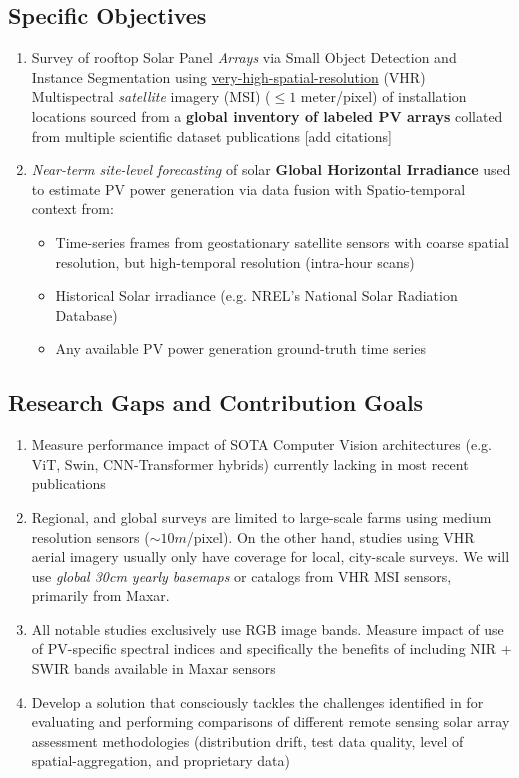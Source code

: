 \subsection{Specific Objectives}
    \begin{enumerate}
        \item Survey of rooftop Solar Panel \textit{Arrays} via Small Object Detection and Instance Segmentation using \href{https://www.maxar.com/maxar-intelligence/constellation}{very-high-spatial-resolution} (VHR) Multispectral \textit{satellite} imagery (MSI) ($\leq1$ meter/pixel) of installation locations sourced from a \textbf{global inventory of labeled PV arrays} collated from multiple scientific dataset publications [add citations] 
        \item \textit{Near-term site-level forecasting} of solar \textbf{Global Horizontal  Irradiance} used to estimate PV power generation via data fusion with Spatio-temporal context from:
        \begin{itemize}
            \item Time-series frames from geostationary satellite sensors with coarse spatial resolution, but high-temporal resolution (intra-hour scans)
            \item Historical Solar irradiance (e.g. NREL's National Solar Radiation Database)
            \item Any available PV power generation ground-truth time series
        \end{itemize}
        
    \end{enumerate}
    
\subsection{Research Gaps and Contribution Goals}
    \begin{enumerate}
        \item Measure performance impact of SOTA Computer Vision architectures (e.g. ViT, Swin, CNN-Transformer hybrids) currently lacking in most recent publications
        \item Regional, and global surveys are limited to large-scale farms using medium resolution sensors ($\sim10m$/pixel). On the other hand, studies using VHR aerial imagery usually only have coverage for local, city-scale surveys. We will use \textit{global 30cm yearly basemaps} or catalogs from VHR MSI sensors, primarily from Maxar. 
        \item All notable studies exclusively use RGB image bands. Measure impact of use of PV-specific spectral indices\cite{He_universal_pv_spectral_index_2024} and specifically the benefits of including NIR + SWIR bands available in Maxar sensors
        \item Develop a solution that consciously tackles the challenges identified in \cite{Hu_solar_array_pitfalls_2022} for evaluating and performing comparisons of different remote sensing solar array assessment methodologies (distribution drift, test data quality, level of spatial-aggregation, and proprietary data)
    \end{enumerate}
    \hfill

